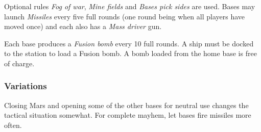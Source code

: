 \documentclass[a4paper,12pt,notitlepage,twocolumn]{article}
\begin{document}
Optional rules \emph{Fog of war}, \emph{Mine fields}  and \emph{Bases
  pick sides} are used. Bases may launch \emph{Missiles} every five
full rounds  (one round being when all players have moved once) and
each also has a \emph{Mass driver} gun.  

Each base produces a \emph{Fusion bomb} every 10 full rounds. A ship must be docked to the
station to load a Fusion bomb. A bomb loaded from the home base is
free of charge.

\subsubsection*{Variations}

Closing Mars and opening some of the other bases for neutral use
changes the tactical situation somewhat. For complete mayhem, let
bases fire missiles more often. 




\end{document}
